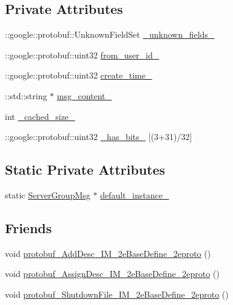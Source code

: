 \subsection*{Private Attributes}
\begin{DoxyCompactItemize}
\item 
\+::google\+::protobuf\+::\+Unknown\+Field\+Set \hyperlink{class_i_m_1_1_base_define_1_1_server_group_msg_a38df86a48f68fb8ec9667645929fa216}{\+\_\+unknown\+\_\+fields\+\_\+}
\item 
\+::google\+::protobuf\+::uint32 \hyperlink{class_i_m_1_1_base_define_1_1_server_group_msg_a7af978067dd36371418ad93e0f3acb5b}{from\+\_\+user\+\_\+id\+\_\+}
\item 
\+::google\+::protobuf\+::uint32 \hyperlink{class_i_m_1_1_base_define_1_1_server_group_msg_aede425ecaa91e72c671172296a99dd84}{create\+\_\+time\+\_\+}
\item 
\+::std\+::string $\ast$ \hyperlink{class_i_m_1_1_base_define_1_1_server_group_msg_afdf988e46077693a90f3f6901352253a}{msg\+\_\+content\+\_\+}
\item 
int \hyperlink{class_i_m_1_1_base_define_1_1_server_group_msg_a47f589c3cdfd9fa4a6f3cb433619d121}{\+\_\+cached\+\_\+size\+\_\+}
\item 
\+::google\+::protobuf\+::uint32 \hyperlink{class_i_m_1_1_base_define_1_1_server_group_msg_ac4f83930580535746900153b15d16885}{\+\_\+has\+\_\+bits\+\_\+} \mbox{[}(3+31)/32\mbox{]}
\end{DoxyCompactItemize}
\subsection*{Static Private Attributes}
\begin{DoxyCompactItemize}
\item 
static \hyperlink{class_i_m_1_1_base_define_1_1_server_group_msg}{Server\+Group\+Msg} $\ast$ \hyperlink{class_i_m_1_1_base_define_1_1_server_group_msg_a5d2c1d7b605a7bee39a36b0371508c7d}{default\+\_\+instance\+\_\+}
\end{DoxyCompactItemize}
\subsection*{Friends}
\begin{DoxyCompactItemize}
\item 
void \hyperlink{class_i_m_1_1_base_define_1_1_server_group_msg_a9e69e602ccebaa03e642ca43da69b2eb}{protobuf\+\_\+\+Add\+Desc\+\_\+\+I\+M\+\_\+2e\+Base\+Define\+\_\+2eproto} ()
\item 
void \hyperlink{class_i_m_1_1_base_define_1_1_server_group_msg_a2c5118df3e7622ff896b422106a76fef}{protobuf\+\_\+\+Assign\+Desc\+\_\+\+I\+M\+\_\+2e\+Base\+Define\+\_\+2eproto} ()
\item 
void \hyperlink{class_i_m_1_1_base_define_1_1_server_group_msg_aa7f5f65378aed5daf4141184fe892bcf}{protobuf\+\_\+\+Shutdown\+File\+\_\+\+I\+M\+\_\+2e\+Base\+Define\+\_\+2eproto} ()
\end{DoxyCompactItemize}



